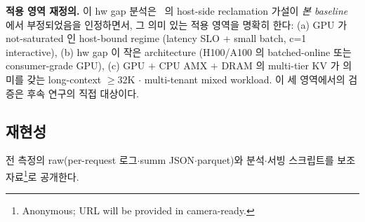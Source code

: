 \textbf{적용 영역 재정의.}
이 hw gap 분석은 \algname\ 의 host-side reclamation 가설이 \emph{본 baseline} 에서 부정되었음을 인정하면서,
그 의미 있는 적용 영역을 명확히 한다:
(a) GPU 가 not-saturated 인 host-bound regime (latency SLO + small batch, c=1 interactive),
(b) hw gap 이 작은 architecture (H100/A100 의 batched-online 또는 consumer-grade GPU),
(c) GPU $+$ CPU AMX $+$ DRAM 의 multi-tier KV 가 의미를 갖는 long-context $\ge\!32$K $\cdot$ multi-tenant
mixed workload.
이 세 영역에서의 검증은 후속 연구의 직접 대상이다.

\subsection{재현성}

전 측정의 raw(per-request 로그$\cdot$summ JSON$\cdot$parquet)와 분석$\cdot$서빙 스크립트를
보조 자료\footnote{Anonymous; URL will be provided in camera-ready.}로 공개한다.
